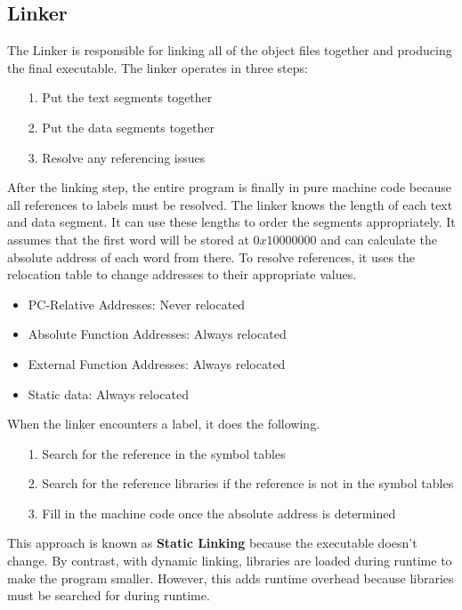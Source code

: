 \documentclass{article}
\begin{document}
\subsection{Linker}
The Linker is responsible for linking all of the object files together and producing the final executable.
The linker operates in three steps:
\begin{itemize}
    \item [1.] Put the text segments together
    \item [2.] Put the data segments together
    \item [3.] Resolve any referencing issues
\end{itemize}
After the linking step, the entire program is finally in pure machine code because all references to labels must be resolved.
The linker knows the length of each text and data segment. It can use these lengths to order the segments appropriately. It assumes
that the first word will be stored at $0x10000000$ and can calculate the absolute address of each word from there. To resolve references,
it uses the relocation table to change addresses to their appropriate values.
\begin{itemize}
    \item PC-Relative Addresses: Never relocated
    \item Absolute Function Addresses: Always relocated
    \item External Function Addresses: Always relocated
    \item Static data: Always relocated
\end{itemize}
When the linker encounters a label, it does the following.
\begin{itemize}
    \item[1.] Search for the reference in the symbol tables
    \item[2.] Search for the reference libraries if the reference is not in the symbol tables
    \item[3.] Fill in the machine code once the absolute address is determined 
\end{itemize}
This approach is known as \textbf{Static Linking} because the executable doesn't change. By contrast,
with dynamic linking, libraries are loaded during runtime to make the program smaller. However, this adds
runtime overhead because libraries must be searched for during runtime.
\end{document}
